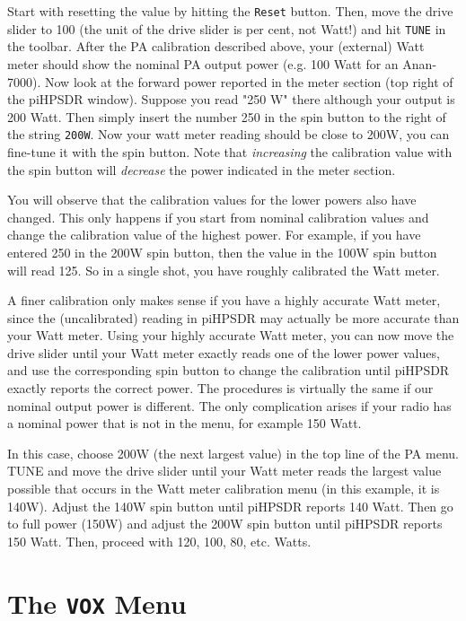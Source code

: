 \documentclass[12pt]{book}
\def\rett#1{\texttt{\color{red}#1}}
\def\pH{pi\-HPSDR\xspace}
\begin{document}
Start with resetting the value by hitting the \rett{Reset} button. Then, move the
drive slider to 100 (the unit of the drive slider is per cent, not Watt!) and hit
\texttt{TUNE} in the toolbar.
After the PA calibration described above, your (external) Watt meter should
show the nominal PA output power (e.g. 100 Watt for an Anan-7000). Now look at the
forward power reported in the meter section (top right of the \pH window).
Suppose you read "250 W" there although your output is 200 Watt. Then simply
insert the number 250 in the spin button to the right of the string
\rett{200W}. Now your watt meter reading should be close to 200W, you can fine-tune
it with the spin button. Note that \textit{increasing} the calibration value
with the spin button will \textit{decrease} the power indicated in the meter section.

You will observe that the calibration values for the lower powers also have changed.
This only happens if you start from nominal calibration values and change the
calibration value of the highest power. For example, if you have entered 250 in
the 200W spin button, then the value in the 100W spin button will read 125. So in a
single shot, you have roughly calibrated the Watt meter.

A finer calibration only makes sense if you have a highly accurate Watt meter, since
the (uncalibrated) reading in \pH may actually be more accurate than your
Watt meter. Using your highly accurate Watt meter,
you can now move the drive slider until your Watt meter exactly reads one of the
lower power values, and use the corresponding spin button to change the calibration
until \pH exactly reports the correct power.
The procedures is  virtually the same if our nominal output power is different.
The only complication arises if your radio has a nominal power that is not in the menu,
for example 150 Watt.

In this case, choose 200W (the next largest value)
in the top line of the PA menu. TUNE and move the drive
slider until your Watt meter reads the largest value possible that occurs
in the Watt meter calibration menu (in this example, it is 140W). Adjust the
140W spin button until \pH reports 140 Watt. Then go to full power
(150W) and adjust the 200W spin button until \pH reports 150 Watt.
Then, proceed with 120, 100, 80, etc. Watts.

\section{The \texttt{VOX} Menu}
\end{document}
